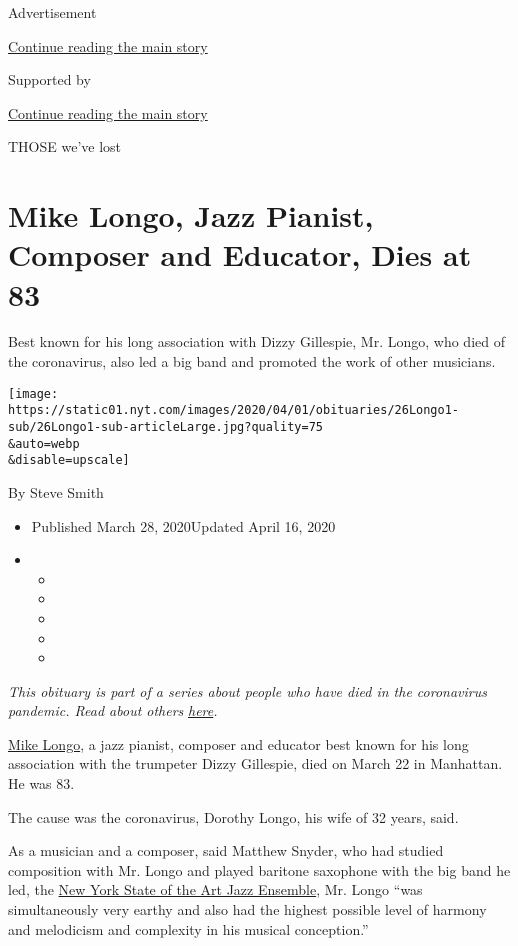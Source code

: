 Advertisement

\protect\hyperlink{after-top}{Continue reading the main story}

Supported by

\protect\hyperlink{after-sponsor}{Continue reading the main story}

THOSE we've lost

\hypertarget{mike-longo-jazz-pianist-composer-and-educator-dies-at-83}{%
\section{Mike Longo, Jazz Pianist, Composer and Educator, Dies at
83}\label{mike-longo-jazz-pianist-composer-and-educator-dies-at-83}}

Best known for his long association with Dizzy Gillespie, Mr. Longo, who
died of the coronavirus, also led a big band and promoted the work of
other musicians.

\texttt{[image: https://static01.nyt.com/images/2020/04/01/obituaries/26Longo1-sub/26Longo1-sub-articleLarge.jpg?quality=75\\\&auto=webp\\\&disable=upscale]}

By Steve Smith

\begin{itemize}
\item
  Published March 28, 2020Updated April 16, 2020
\item
  \begin{itemize}
  \item
  \item
  \item
  \item
  \item
  \end{itemize}
\end{itemize}

\emph{This obituary is part of a series about people who have died in
the coronavirus pandemic. Read about others}
\href{https://www.nytimes.com/series/people-who-have-died-of-the-coronavirus}{\emph{here}}\emph{.}

\href{https://www.mikelongojazz.com/}{Mike Longo}, a jazz pianist,
composer and educator best known for his long association with the
trumpeter Dizzy Gillespie, died on March 22 in Manhattan. He was 83.

The cause was the coronavirus, Dorothy Longo, his wife of 32 years,
said.

As a musician and a composer, said Matthew Snyder, who had studied
composition with Mr. Longo and played baritone saxophone with the big
band he led, the \href{https://www.youtube.com/watch?v=Xr-lHtW5wDA}{New
York State of the Art Jazz Ensemble}, Mr. Longo ``was simultaneously
very earthy and also had the highest possible level of harmony and
melodicism and complexity in his musical conception.''

